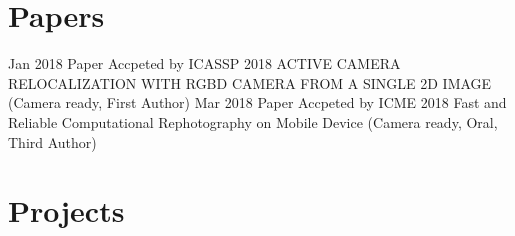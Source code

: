 \documentclass[utf8]{twentysecondcv} %
\begin{document}
\section{Papers}

\begin{twenty}
    \twentyitem
        {Jan 2018}
        {}        
        {Paper Accpeted by ICASSP 2018}
        {}
        {}
        {ACTIVE CAMERA RELOCALIZATION WITH RGBD CAMERA
FROM A SINGLE 2D IMAGE (Camera ready, First Author)}
    \twentyitem
        {Mar 2018}
        {}        
        {Paper Accpeted by ICME 2018}
        {}
        {}
        {Fast and Reliable Computational Rephotography on Mobile Device (Camera ready, Oral, Third Author)}
\end{twenty}

\section{Projects}
\end{document}

